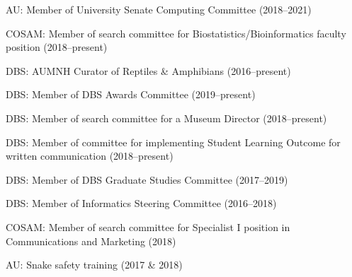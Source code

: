 \begin{veryTightItemize}
    \item AU: Member of University Senate Computing Committee (2018--2021)
    \item COSAM: Member of search committee for Biostatistics/Bioinformatics
        faculty position (2018--present)
    \item DBS: AUMNH Curator of Reptiles \& Amphibians (2016--present)
    \item DBS: Member of DBS Awards Committee (2019--present)
    \item DBS: Member of search committee for a Museum Director (2018--present)
    \item DBS: Member of committee for implementing Student Learning Outcome
        for written communication (2018--present)
    \item DBS: Member of DBS Graduate Studies Committee (2017--2019)
    \item DBS: Member of Informatics Steering Committee (2016--2018)
    \item COSAM: Member of search committee for Specialist I position in
        Communications and Marketing (2018)
    \item AU: Snake safety training (2017 \& 2018)
\end{veryTightItemize}
